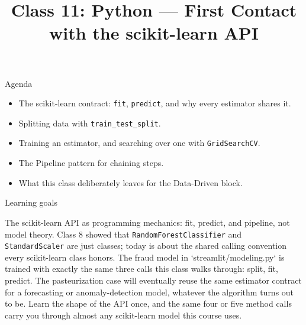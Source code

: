 

\title{Class 11: Python --- First Contact with the scikit-learn API}
\author{\coursename}
\date{}



\frame{\titlepage \coursefooter}

\begin{frame}{Agenda}
\begin{itemize}
\item The scikit-learn contract: \texttt{fit}, \texttt{predict}, and why every estimator shares it.
\item Splitting data with \texttt{train\_test\_split}.
\item Training an estimator, and searching over one with \texttt{GridSearchCV}.
\item The Pipeline pattern for chaining steps.
\item What this class deliberately leaves for the Data-Driven block.
\end{itemize}
\coursefooter
\end{frame}

\begin{frame}{Learning goals}
\coursefooter
\end{frame}

\coursecontextframe
{The scikit-learn API as programming mechanics: fit, predict, and pipeline, not model theory.}
{Class 8 showed that \texttt{RandomForestClassifier} and \texttt{StandardScaler} are just classes; today is about the shared calling convention every scikit-learn class honors.}
{The fraud model in `streamlit/modeling.py` is trained with exactly the same three calls this class walks through: split, fit, predict.}
{The pasteurization case will eventually reuse the same estimator contract for a forecasting or anomaly-detection model, whatever the algorithm turns out to be.}
{Learn the shape of the API once, and the same four or five method calls carry you through almost any scikit-learn model this course uses.}

